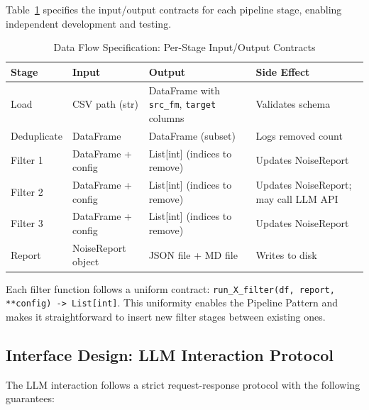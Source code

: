 \documentclass[acmlarge,nonacm,screen]{acmart}
\begin{document}
Table~\ref{tab:dataflow} specifies the input/output contracts for each pipeline stage, enabling independent development and testing.

\begin{table}[htbp]
\caption{Data Flow Specification: Per-Stage Input/Output Contracts}
\label{tab:dataflow}
\begin{tabular}{@{}lp{3.5cm}p{3.5cm}p{2.5cm}@{}}
\toprule
\textbf{Stage} & \textbf{Input} & \textbf{Output} & \textbf{Side Effect} \\
\midrule
Load & CSV path (str) & DataFrame with \texttt{src\_fm}, \texttt{target} columns & Validates schema \\
Deduplicate & DataFrame & DataFrame (subset) & Logs removed count \\
Filter 1 & DataFrame + config & List[int] (indices to remove) & Updates NoiseReport \\
Filter 2 & DataFrame + config & List[int] (indices to remove) & Updates NoiseReport; may call LLM API \\
Filter 3 & DataFrame + config & List[int] (indices to remove) & Updates NoiseReport \\
Report & NoiseReport object & JSON file + MD file & Writes to disk \\
\bottomrule
\end{tabular}
\end{table}

Each filter function follows a uniform contract: \texttt{run\_X\_filter(df, report, **config) -> List[int]}. This uniformity enables the Pipeline Pattern and makes it straightforward to insert new filter stages between existing ones.

\subsection{Interface Design: LLM Interaction Protocol}

The LLM interaction follows a strict request-response protocol with the following guarantees:
\end{document}
